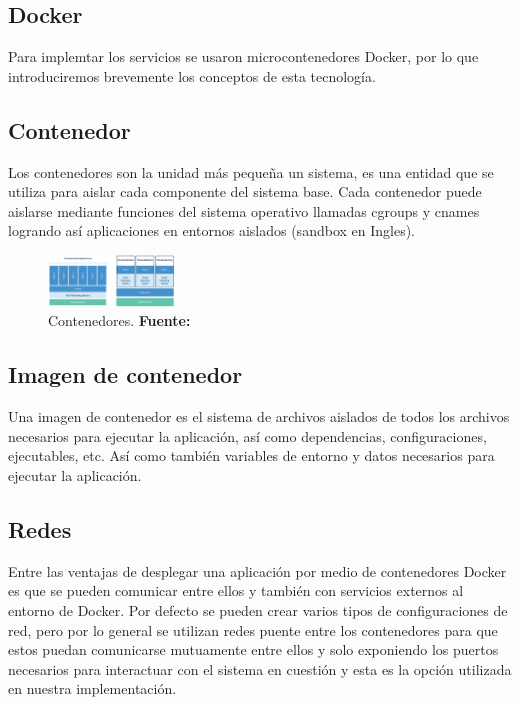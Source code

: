 \subsection{Docker}

Para implemtar los servicios se usaron microcontenedores Docker, por lo que introduciremos
brevemente los conceptos de esta tecnología.

\subsection{Contenedor}

Los contenedores son la unidad más pequeña un sistema, es una entidad que se utiliza para aislar
cada componente del sistema base. Cada contenedor puede aislarse mediante funciones del sistema
operativo llamadas cgroups y cnames logrando así aplicaciones en entornos aislados (sandbox en
Ingles). \cite{Docker}
\begin{figure}[H]
\begin{centering}
\includegraphics[angle=0,width=0.3\textwidth]{Figuras/docker-container.png}
\par \end{centering}
\caption[Contenedores]{Contenedores. \textbf{Fuente:} \cite{Docker}}
\label{Contenedores}
\end{figure}

\subsection{Imagen de contenedor}
Una imagen de contenedor es el sistema de archivos aislados de todos los archivos necesarios para
ejecutar la aplicación, así como dependencias, configuraciones, ejecutables, etc. Así como también
variables de entorno y datos necesarios para ejecutar la aplicación. \cite{Docker}

\subsection{Redes}
Entre las ventajas de desplegar una aplicación por medio de contenedores Docker es que se pueden
comunicar entre ellos y también con servicios externos al entorno de Docker. Por defecto se pueden
crear varios tipos de configuraciones de red, pero por lo general se utilizan redes puente entre
los contenedores para que estos puedan comunicarse mutuamente entre ellos y solo exponiendo los
puertos necesarios para interactuar con el sistema en cuestión y esta es la opción utilizada en
nuestra implementación. \cite{Docker}

